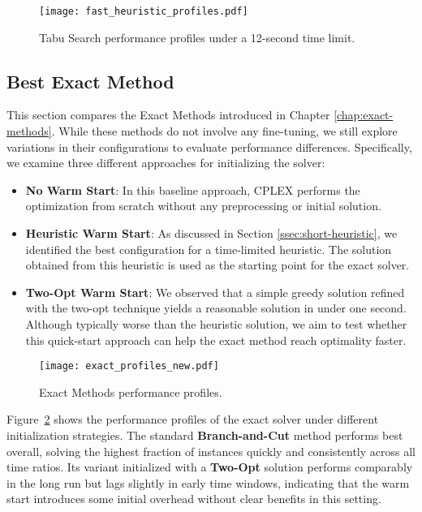 \begin{figure}[H]
  \centering
  \texttt{[image: fast\_heuristic\_profiles.pdf]}
  \caption{Tabu Search performance profiles under a 12-second time limit.}
  \label{fig:fast-heuristic}
\end{figure}

\subsection{Best Exact Method}

This section compares the Exact Methods introduced in Chapter \ref{chap:exact-methods}. While these methods do not involve any fine-tuning, we still explore variations in their configurations to evaluate performance differences. Specifically, we examine three different approaches for initializing the solver:

\begin{itemize}
\item \textbf{No Warm Start}: In this baseline approach, CPLEX performs the optimization from scratch without any preprocessing or initial solution.
\item \textbf{Heuristic Warm Start}: As discussed in Section \ref{ssec:short-heuristic}, we identified the best configuration for a time-limited heuristic. The solution obtained from this heuristic is used as the starting point for the exact solver.
\item \textbf{Two-Opt Warm Start}: We observed that a simple greedy solution refined with the two-opt technique yields a reasonable solution in under one second. Although typically worse than the heuristic solution, we aim to test whether this quick-start approach can help the exact method reach optimality faster.
\end{itemize}

\begin{figure}[H]
  \centering
  \texttt{[image: exact\_profiles\_new.pdf]}
  \caption{Exact Methods performance profiles.}
  \label{fig:exact}
\end{figure}

Figure~\ref{fig:exact} shows the performance profiles of the exact solver under different initialization strategies. The standard \textbf{Branch-and-Cut} method performs best overall, solving the highest fraction of instances quickly and consistently across all time ratios. Its variant initialized with a \textbf{Two-Opt} solution performs comparably in the long run but lags slightly in early time windows, indicating that the warm start introduces some initial overhead without clear benefits in this setting.

